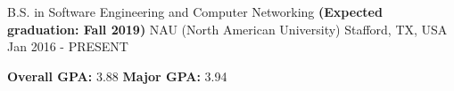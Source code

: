 \begin{cventries}
  \cventry
    {B.S. in Software Engineering and Computer Networking \textbf{(Expected graduation: Fall 2019)}}
    {NAU (North American University)}
    {Stafford, TX, USA}
    {Jan 2016 - PRESENT}
    {
      \begin{cvitems}
        \item {\textbf{Overall GPA:} 3.88 \space\space \textbf{Major GPA:} 3.94}
      \end{cvitems} 
    }
\end{cventries}
